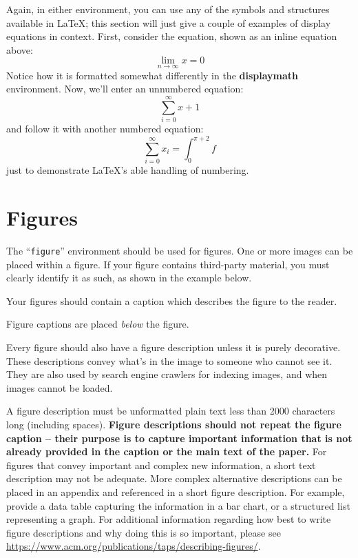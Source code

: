 \documentclass[acmsmall,natbib=false]{acmart}
\begin{document}
Again, in either environment, you can use any of the symbols and
structures available in \LaTeX\@; this section will just give a couple
of examples of display equations in context.  First, consider the
equation, shown as an inline equation above:
\begin{equation}
    \lim_{n\rightarrow \infty}x=0
\end{equation}
Notice how it is formatted somewhat differently in
the \textbf{displaymath}
environment.  Now, we'll enter an unnumbered equation:
\begin{displaymath}
    \sum_{i=0}^{\infty} x + 1
\end{displaymath}
and follow it with another numbered equation:
\begin{equation}
    \sum_{i=0}^{\infty}x_i=\int_{0}^{\pi+2} f
\end{equation}
just to demonstrate \LaTeX's able handling of numbering.

\section{Figures}

The ``\verb|figure|'' environment should be used for figures. One or
more images can be placed within a figure. If your figure contains
third-party material, you must clearly identify it as such, as shown
in the example below.

Your figures should contain a caption which describes the figure to
the reader.

Figure captions are placed {\itshape below} the figure.

Every figure should also have a figure description unless it is purely
decorative. These descriptions convey what’s in the image to someone
who cannot see it. They are also used by search engine crawlers for
indexing images, and when images cannot be loaded.

A figure description must be unformatted plain text less than 2000
characters long (including spaces).  {\bfseries Figure descriptions
        should not repeat the figure caption – their purpose is to capture
        important information that is not already provided in the caption or
        the main text of the paper.} For figures that convey important and
complex new information, a short text description may not be
adequate. More complex alternative descriptions can be placed in an
appendix and referenced in a short figure description. For example,
provide a data table capturing the information in a bar chart, or a
structured list representing a graph.  For additional information
regarding how best to write figure descriptions and why doing this is
so important, please see
\url{https://www.acm.org/publications/taps/describing-figures/}.
\end{document}
